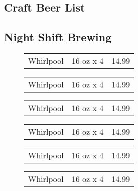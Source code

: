 \documentclass[10pt]{article}
\begin{document}
  \pagestyle{empty}
  \begin{multicols}{3}
  
  \section*{Craft Beer List}
  \subsection*{Night Shift Brewing}
    \begin{description}
      \item[]
      \begin{tabular}{l c r}Whirlpool & 16 oz x 4 & 14.99\end{tabular}
      \item[]\begin{tabular}{l c r}Whirlpool & 16 oz x 4 & 14.99\end{tabular}
      \item[]\begin{tabular}{l c r}Whirlpool & 16 oz x 4 & 14.99\end{tabular}
      \item[]\begin{tabular}{l c r}Whirlpool & 16 oz x 4 & 14.99\end{tabular}
      \item[]\begin{tabular}{l c r}Whirlpool & 16 oz x 4 & 14.99\end{tabular}
      \item[]\begin{tabular}{l c r}Whirlpool & 16 oz x 4 & 14.99\end{tabular}
    \end{description}

\end{multicols}
\end{document}
